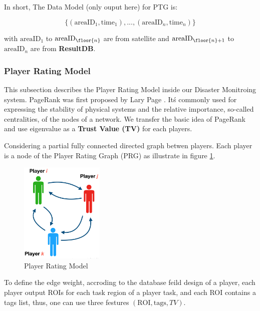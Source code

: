    In short, The Data Model (only ouput here) for PTG is:

    \[
    \{(\text{areaID}_1, \text{time}_1), ..., (\text{areaID}_n, \text{time}_n)\}
    \]

    with $\text{areaID}_1$ to $\text{areaID}_{\floor{n}}$ are from satellite and 
    $\text{areaID}_{\floor{n}+1}$ to $\text{areaID}_{n}$ are from \textbf{ResultDB}.

\subsubsection{Player Rating Model}

  This subsection describes the Player Rating Model inside our Disaster Monitroing system.
  PageRank was first proposed by Lary Page \cite{page1999pagerank}. It\'s commonly used for 
  expressing the stability of physical systems and the relative importance, so-called centralities, 
  of the nodes of a network. We transfer the basic idea of PageRank and use eigenvalue
  as a \textbf{Trust Value (TV)} for each players.

  Considering a partial fully connected directed graph betwen players. 
  Each player is a node of the Player Rating Graph (PRG) as illustrate in figure \ref{fig:graph}.

  \begin{figure}[htp]
  \centering
  \includegraphics[width=4cm]{figures/graph}
  \caption{Player Rating Model}
  \label{fig:graph}
  \end{figure}
  
  To define the edge weight, accroding to the database feild design of a player, each player
  output ROIs for each task region of a player task, and each ROI contains a tags list, thus, 
  one can use three festures $(\text{ROI}, \text{tags}, TV)$.


